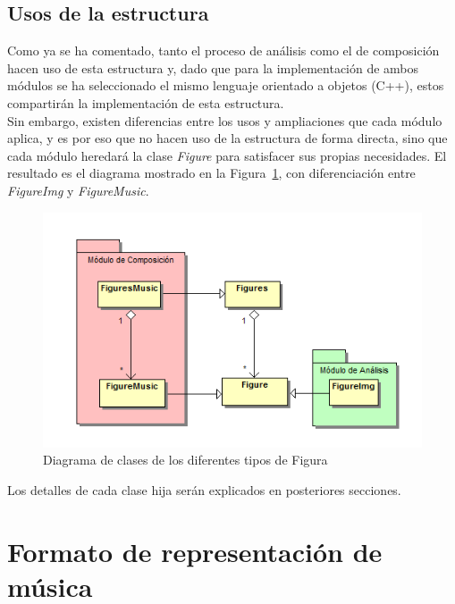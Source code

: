 			
\subsection{Usos de la estructura}	
\label{subsec:usosFigure}

	Como ya se ha comentado, tanto el proceso de análisis como el de composición hacen uso de esta estructura y, dado que para la implementación de ambos módulos se ha seleccionado el mismo lenguaje orientado a objetos (C++), estos compartirán la implementación de esta estructura.\\
	
	Sin embargo, existen diferencias entre los usos y ampliaciones que cada módulo aplica, y es por eso que no hacen uso de la estructura de forma directa,  sino que cada módulo heredará la clase \emph{Figure} para satisfacer sus propias necesidades. El resultado es el diagrama mostrado en la Figura~\ref{fig:diagramaFigMupPhic}, con diferenciación entre \emph{FigureImg} y \emph{FigureMusic}.\\

		\begin{figure}[htbp]
		\centering
		\includegraphics[scale=0.5]{graphics/diagramaFigMupPhic.png}
		\caption{Diagrama de clases de los diferentes tipos de Figura}
		\label{fig:diagramaFigMupPhic}
		\end{figure}
		
	Los detalles de cada clase hija serán explicados en posteriores secciones.	


\section{Formato de representación de música}
\label{sec:repMusic}

